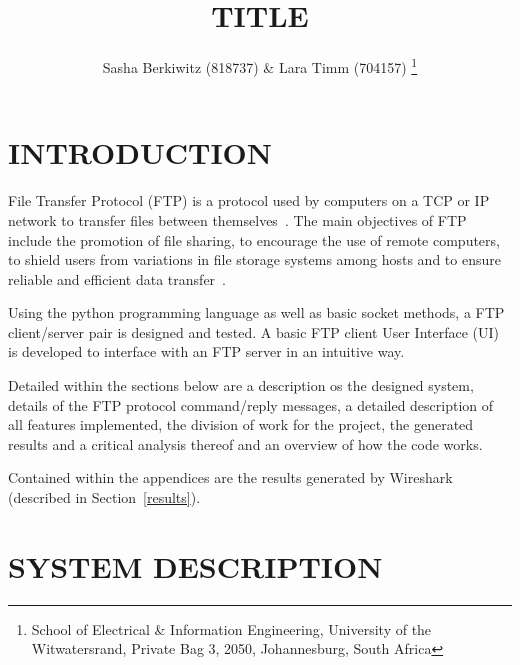 \documentclass[10pt,twocolumn]{witseiepaper}
\begin{document}
\title{TITLE}

\author{Sasha Berkiwitz (818737) \& Lara Timm (704157)
\thanks{School of Electrical \& Information Engineering, University of the
Witwatersrand, Private Bag 3, 2050, Johannesburg, South Africa}
}


%
\abstract{}

\keywords{}

\maketitle
\pagestyle{plain}
\setcounter{page}{1}


\section{INTRODUCTION}

File Transfer Protocol (FTP) is a protocol used by computers on a TCP or IP network to transfer files between themselves~\cite{FTPbeginners}. The main objectives of FTP include the promotion of file sharing, to encourage the use of remote computers, to shield users from variations in file storage systems among hosts and to ensure reliable and efficient data transfer~\cite{rfc959}. 

Using the python programming language as well as basic socket methods, a FTP client/server pair is designed and tested. A basic FTP client User Interface (UI) is developed to interface with an FTP server in an intuitive way.

Detailed within the sections below are a description os the designed system, details of the FTP protocol command/reply messages, a detailed description of all features implemented, the division of work for the project, the generated results and a critical analysis thereof and an overview of how the code works. 

Contained within the appendices are the results generated by Wireshark (described in Section~\ref{results}).

\section{SYSTEM DESCRIPTION}
\end{document}
